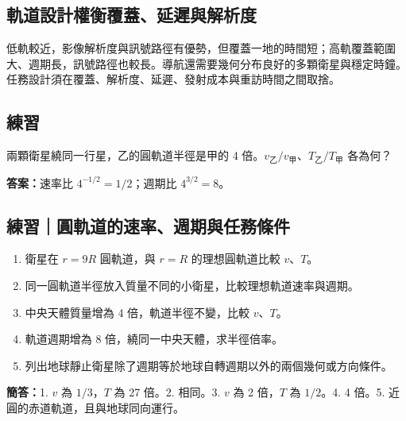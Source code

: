 \documentclass[11pt,a4paper]{article}
\providecommand{\tightlist}{%
  \setlength{\itemsep}{0pt}\setlength{\parskip}{0pt}}
\begin{document}
\subsection{軌道設計權衡覆蓋、延遲與解析度}\label{ux8eccux9053ux8a2dux8a08ux6b0aux8861ux8986ux84cbux5ef6ux9072ux8207ux89e3ux6790ux5ea6}

低軌較近，影像解析度與訊號路徑有優勢，但覆蓋一地的時間短；高軌覆蓋範圍大、週期長，訊號路徑也較長。導航還需要幾何分布良好的多顆衛星與穩定時鐘。任務設計須在覆蓋、解析度、延遲、發射成本與重訪時間之間取捨。

\begin{HandoutSelfCheck}

\subsection{練習}\label{ux7df4ux7fd2-2}

兩顆衛星繞同一行星，乙的圓軌道半徑是甲的 4 倍。\(v_{\text{乙}}/v_{\text{甲}}\)、\(T_{\text{乙}}/T_{\text{甲}}\) 各為何？

\textbf{答案：}速率比 \(4^{-1/2}=1/2\)；週期比 \(4^{3/2}=8\)。

\end{HandoutSelfCheck}

\begin{HandoutSelfCheck}

\subsection{練習｜圓軌道的速率、週期與任務條件}\label{ux7df4ux7fd2ux5713ux8eccux9053ux7684ux901fux7387ux9031ux671fux8207ux4efbux52d9ux689dux4ef6}

\begin{enumerate}
\def\labelenumi{\arabic{enumi}.}
\tightlist
\item
  衛星在 \(r=9R\) 圓軌道，與 \(r=R\) 的理想圓軌道比較 \(v\)、\(T\)。
\item
  同一圓軌道半徑放入質量不同的小衛星，比較理想軌道速率與週期。
\item
  中央天體質量增為 4 倍，軌道半徑不變，比較 \(v\)、\(T\)。
\item
  軌道週期增為 8 倍，繞同一中央天體，求半徑倍率。
\item
  列出地球靜止衛星除了週期等於地球自轉週期以外的兩個幾何或方向條件。
\end{enumerate}

\textbf{簡答：}1. \(v\) 為 \(1/3\)，\(T\) 為 27 倍。2. 相同。3. \(v\) 為 2 倍，\(T\) 為 \(1/2\)。4. 4 倍。5. 近圓的赤道軌道，且與地球同向運行。

\end{HandoutSelfCheck}
\end{document}
